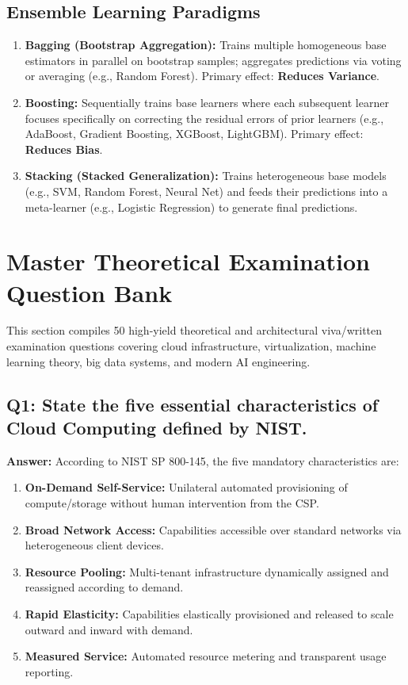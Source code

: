 \subsection{Ensemble Learning Paradigms}
\begin{enumerate}
    \item \textbf{Bagging (Bootstrap Aggregation):} Trains multiple homogeneous base estimators in parallel on bootstrap samples; aggregates predictions via voting or averaging (e.g., Random Forest). Primary effect: \textbf{Reduces Variance}.
    \item \textbf{Boosting:} Sequentially trains base learners where each subsequent learner focuses specifically on correcting the residual errors of prior learners (e.g., AdaBoost, Gradient Boosting, XGBoost, LightGBM). Primary effect: \textbf{Reduces Bias}.
    \item \textbf{Stacking (Stacked Generalization):} Trains heterogeneous base models (e.g., SVM, Random Forest, Neural Net) and feeds their predictions into a meta-learner (e.g., Logistic Regression) to generate final predictions.
\end{enumerate}



\section{Master Theoretical Examination Question Bank}
\label{sec:cloud_ml_theoretical_bank}

This section compiles 50 high-yield theoretical and architectural viva/written examination questions covering cloud infrastructure, virtualization, machine learning theory, big data systems, and modern AI engineering.

\subsection*{Q1: State the five essential characteristics of Cloud Computing defined by NIST.}
\textbf{Answer:} According to NIST SP 800-145, the five mandatory characteristics are:
\begin{enumerate}[label=\arabic*.]
    \item \textbf{On-Demand Self-Service:} Unilateral automated provisioning of compute/storage without human intervention from the CSP.
    \item \textbf{Broad Network Access:} Capabilities accessible over standard networks via heterogeneous client devices.
    \item \textbf{Resource Pooling:} Multi-tenant infrastructure dynamically assigned and reassigned according to demand.
    \item \textbf{Rapid Elasticity:} Capabilities elastically provisioned and released to scale outward and inward with demand.
    \item \textbf{Measured Service:} Automated resource metering and transparent usage reporting.
\end{enumerate}

